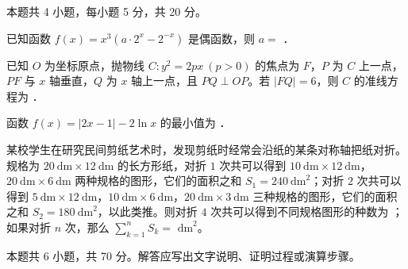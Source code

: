 \begin{gktip}
本题共 4 小题，每小题 5 分，共 20 分。
\end{gktip}

\begin{question}
已知函数 $f(x)=x^{3}\left(a\cdot2^{x}-2^{-x}\right)$ 是偶函数，则 $a=$ \gkblank{}．

\end{question}
\begin{question}
已知 $O$ 为坐标原点，抛物线 $C:y^{2}=2px\ (p>0)$ 的焦点为 $F$，$P$ 为 $C$ 上一点，$PF$ 与 $x$ 轴垂直，$Q$ 为 $x$ 轴上一点，且 $PQ\perp OP$。若 $|FQ|=6$，则 $C$ 的准线方程为 \gkblank{}．

\end{question}
\begin{question}
函数 $f(x)=|2x-1|-2\ln x$ 的最小值为 \gkblank{}．

\end{question}
\begin{question}
某校学生在研究民间剪纸艺术时，发现剪纸时经常会沿纸的某条对称轴把纸对折。规格为 $20\ \mathrm{dm}\times12\ \mathrm{dm}$ 的长方形纸，对折 $1$ 次共可以得到 $10\ \mathrm{dm}\times12\ \mathrm{dm}$，$20\ \mathrm{dm}\times6\ \mathrm{dm}$ 两种规格的图形，它们的面积之和 $S_1=240\ \mathrm{dm}^{2}$；对折 $2$ 次共可以得到 $5\ \mathrm{dm}\times12\ \mathrm{dm}$，$10\ \mathrm{dm}\times6\ \mathrm{dm}$，$20\ \mathrm{dm}\times3\ \mathrm{dm}$ 三种规格的图形，它们的面积之和 $S_2=180\ \mathrm{dm}^{2}$，以此类推。则对折 $4$ 次共可以得到不同规格图形的种数为 \gkblank{}；如果对折 $n$ 次，那么 $\displaystyle\sum_{k=1}^{n}S_k=$ \gkblank{} $\mathrm{dm}^{2}$。

\par\medskip

\end{question}

\begin{gktip}
本题共 6 小题，共 70 分。解答应写出文字说明、证明过程或演算步骤。
\end{gktip}

